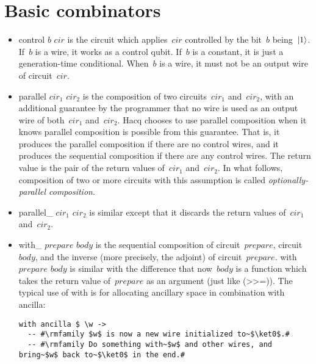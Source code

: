 \documentclass[11pt]{article}
\DeclarePairedDelimiter{\ket}{\lvert}{\rangle}
\newcommand{\var}[1]{\mathit{#1}}
\begin{document}
\section{Basic combinators}

\begin{itemize}
\item
  \textsf{control $\var{b}$ $\var{cir}$} is the circuit
  which applies~$\var{cir}$ controlled by the bit~$\var{b}$ being~$\ket1$.
  If~$\var{b}$ is a wire, it works as a control qubit.
  If~$\var{b}$ is a constant, it is just a generation-time conditional.
  When~$\var{b}$ is a wire, it must not be an output wire of circuit~$\var{cir}$.
\item
  \textsf{parallel $\var{cir}_1$ $\var{cir}_2$}
  is the composition of two circuits~$\var{cir}_1$ and~$\var{cir}_2$,
  with an additional guarantee by the programmer
  that no wire is used as an output wire of both~$\var{cir}_1$ and~$\var{cir}_2$.
  Hacq chooses to use parallel composition when it knows parallel composition
  is possible from this guarantee.
  That is, it produces the parallel composition
  if there are no control wires,
  and it produces the sequential composition if there are any control wires.
  The return value is the pair of the return values of~$\var{cir}_1$ and~$\var{cir}_2$.
  In what follows, composition of two or more circuits with this assumption
  is called \emph{optionally-parallel composition}.
\item
  \textsf{parallel\_ $\var{cir}_1$ $\var{cir}_2$} is similar
  except that it discards the return values of~$\var{cir}_1$ and~$\var{cir}_2$.
\item
  \textsf{with\_ $\var{prepare}$ $\var{body}$} is the sequential composition
  of circuit~$\var{prepare}$, circuit~$\var{body}$,
  and the inverse (more precisely, the adjoint) of circuit~$\var{prepare}$.
  \textsf{with $\var{prepare}$ $\var{body}$} is similar
  with the difference that now~$\var{body}$ is a function
  which takes the return value of~$\var{prepare}$ as an argument
  (just like \textsf{(\textgreater\relax\textgreater=)}).
  The typical use of \textsf{with} is for allocating ancillary space in combination with \textsf{ancilla}:
\begin{lstlisting}[frame=single,caption={Allocation of an ancillary wire using \textsf{ancilla} and \textsf{with}.}]
with ancilla $ \w ->
  -- #\rmfamily $w$ is now a new wire initialized to~$\ket0$.#
  -- #\rmfamily Do something with~$w$ and other wires, and bring~$w$ back to~$\ket0$ in the end.#
\end{lstlisting}

\end{itemize}
\end{document}
